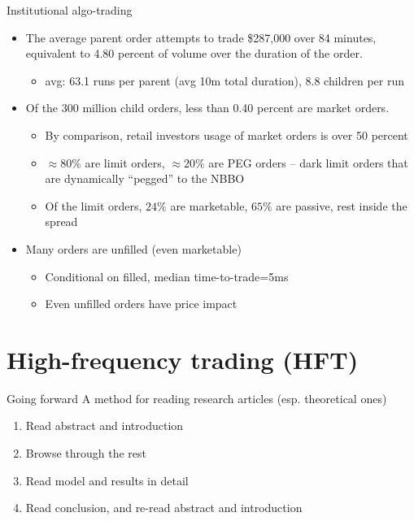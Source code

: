 \documentclass[english,10pt
,aspectratio=169
]{beamer}
\begin{document}
\begin{frame}{Institutional algo-trading}
	\begin{itemize}
		\item The average parent order attempts to trade \$287,000 over 84
		minutes, equivalent to 4.80 percent of volume over the duration of the order.
		\begin{itemize}
			\item avg: 63.1 runs per parent (avg 10m total duration), 8.8 children per run
		\end{itemize}
		\item Of the 300 million child orders, less than 0.40 percent are market orders.
		\begin{itemize}
			\item By comparison, retail investors usage of market orders is over 50 percent
			\item $\approx 80\%$ are limit orders, $\approx 20\%$ are PEG orders -- dark limit orders that are dynamically “pegged” to the NBBO
			\item Of the limit orders, $24\%$ are marketable, $65\%$ are passive, rest inside the spread
		\end{itemize}
		\item Many orders are unfilled (even marketable)
		\begin{itemize}
			\item Conditional on filled, median time-to-trade=5ms
			\item Even unfilled orders have price impact
		\end{itemize}
	\end{itemize}
\end{frame}



\section{High-frequency trading (HFT)}

\begin{frame}{Going forward}
	A method for reading research articles (esp. theoretical ones)
	\begin{enumerate}
		\item Read abstract and introduction
		\item Browse through the rest
		\item Read model and results in detail
		\item Read conclusion, and re-read abstract and introduction
	\end{enumerate}
\end{frame}
\end{document}
